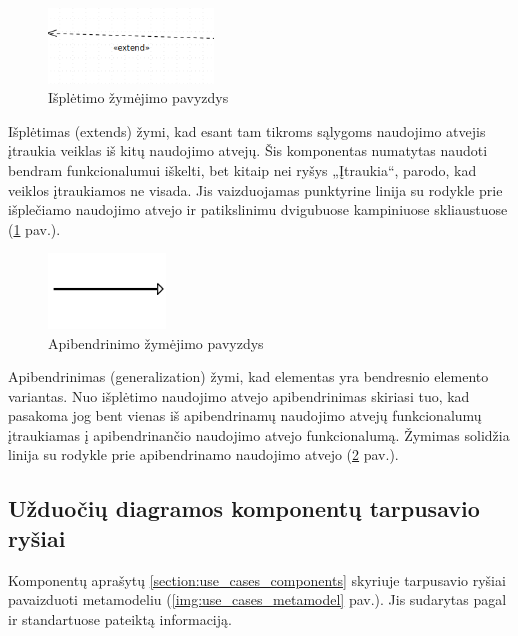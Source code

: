\begin{figure}[H]
	\centering
	\includegraphics[height=2cm]{img/use_case_components/extend}
	\caption{Išplėtimo žymėjimo pavyzdys}
	\label{img:use_case_components_extends}
\end{figure}

Išplėtimas (extends) žymi, kad esant tam tikroms sąlygoms naudojimo atvejis įtraukia veiklas iš kitų naudojimo atvejų. Šis komponentas numatytas naudoti bendram funkcionalumui iškelti, bet kitaip nei ryšys „Įtraukia“, parodo, kad veiklos įtraukiamos ne visada. Jis vaizduojamas punktyrine linija su rodykle prie išplečiamo naudojimo atvejo ir patikslinimu dvigubuose kampiniuose skliaustuose (\ref{img:use_case_components_extends} pav.).

\begin{figure}[H]
	\centering
	\includegraphics[height=2cm]{img/use_case_components/generalization}
	\caption{Apibendrinimo žymėjimo pavyzdys}
	\label{img:use_case_components_generalization}
\end{figure}

Apibendrinimas (generalization) žymi, kad elementas yra bendresnio elemento variantas. Nuo išplėtimo naudojimo atvejo apibendrinimas skiriasi tuo, kad pasakoma jog bent vienas iš apibendrinamų naudojimo atvejų funkcionalumų įtraukiamas į apibendrinančio naudojimo atvejo funkcionalumą. Žymimas solidžia linija su rodykle prie apibendrinamo naudojimo atvejo (\ref{img:use_case_components_generalization} pav.).

\subsection{Užduočių diagramos komponentų tarpusavio ryšiai}

Komponentų aprašytų \ref{section:use_cases_components} skyriuje tarpusavio ryšiai  pavaizduoti metamodeliu (\ref{img:use_cases_metamodel} pav.). Jis sudarytas pagal \UML ir \SysML standartuose pateiktą informaciją. 


